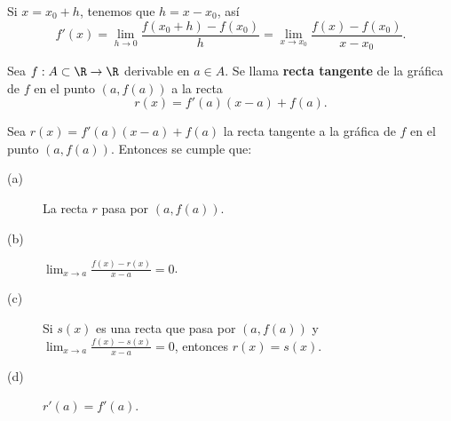 \begin{observation}
\normalfont Si $\displaystyle x = x_{0} +h $, tenemos que $\displaystyle h = x - x_{0} $, así
\[f'\left(x\right) = \lim_{h \to 0}\frac{f\left(x_{0}+h\right)-f\left(x_{0}\right)}{h} = \lim_{x \to x_{0}}\frac{f\left(x\right)-f\left(x_{0}\right)}{x - x_{0}} .\]
\end{observation}
\begin{fdefinition}
\normalfont Sea $\displaystyle f : A \subset \R \to \R $ derivable en $\displaystyle a \in A $. Se llama \textbf{recta tangente} de la gráfica de $\displaystyle f $ en el punto $\displaystyle \left(a,f\left(a\right)\right) $ a la recta
\[r\left(x\right) = f'\left(a\right)\left(x-a\right) + f\left(a\right) .\]
\end{fdefinition}
\begin{ftheorem}[]
\normalfont Sea $\displaystyle r\left(x\right) = f'\left(a\right)\left(x-a\right) + f\left(a\right) $ la recta tangente a la gráfica de $\displaystyle f $ en el punto $\displaystyle \left(a,f\left(a\right)\right) $. Entonces se cumple que:
\begin{description}
\item[(a)] La recta $\displaystyle r $ pasa por $\displaystyle \left(a, f\left(a\right)\right) $.
\item[(b)] $\displaystyle \lim_{x \to a} \frac{f\left(x\right)-r\left(x\right)}{x - a} = 0 $.
\item[(c)] Si $\displaystyle s\left(x\right) $ es una recta que pasa por $\displaystyle \left(a, f\left(a\right)\right) $ y $\displaystyle \lim_{x \to a}\frac{f\left(x\right)-s\left(x\right)}{x-a} = 0 $, entonces $\displaystyle r\left(x\right) = s\left(x\right) $.
\item[(d)] $\displaystyle r'\left(a\right) = f'\left(a\right) $.
\end{description}
\end{ftheorem}
